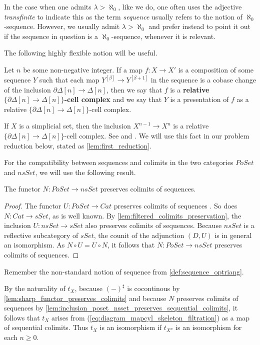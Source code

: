 In the case when one admits $\lambda >\aleph _0$, like we do, one often uses the adjective \emph{transfinite} to indicate this as the term \emph{sequence} usually refers to the notion of $\aleph _0$-sequence. However, we usually admit $\lambda >\aleph _0$ and prefer instead to point it out if the sequence in question is a $\aleph _0$-sequence, whenever it is relevant.

The following highly flexible notion \cite[Def.~10.2.1]{Hi03} will be useful.
\begin{definition}
Let $n$ be some non-negative integer. If a map $f:X\to X'$ is a composition of some sequence $Y$ such that each map $Y^{[\beta ]}\to Y^{[\beta +1]}$ in the sequence is a cobase change of the inclusion $\partial \Delta [n]\to \Delta [n]$, then we say that $f$ is a \textbf{relative $\{ \partial \Delta [n]\to \Delta [n]\}$-cell complex} and we say that $Y$ is a presentation of $f$ as a relative $\{ \partial \Delta [n]\to \Delta [n]\}$-cell complex.
\end{definition}
\noindent If $X$ is a simplicial set, then the inclusion $X^{n-1}\to X^n$ is a relative $\{ \partial \Delta [n]\to \Delta [n]\}$-cell complex. See \cite[Cor.~4.2.4~(ii)]{FP90} and \cite[Prop.~10.2.14]{Hi03}. We will use this fact in our problem reduction below, stated as \cref{lem:first_reduction}.

For the compatibility between sequences and colimits in the two categories $PoSet$ and $nsSet$, we will use the following result.
\begin{lemma}
\label{lem:inclusion_poset_nsset_preserves_sequential_colimits}
The functor $N:PoSet\to nsSet$ preserves colimits of sequences.
\end{lemma}
\begin{proof}
The functor $U:PoSet\to Cat$ preserves colimits of sequences \cite[p.~216]{Ra10}. So does $N:Cat\to sSet$, as is well known. By \cref{lem:filtered_colimits_preservation}, the inclusion $U:nsSet\to sSet$ also preserves colimits of sequences. Because $nsSet$ is a reflective subcategory of $sSet$, the counit of the adjunction $(D,U)$ is in general an isomorphism. As $N\circ U=U\circ N$, it follows that $N:PoSet\to nsSet$ preserves colimits of sequences.
\end{proof}
\noindent Remember the non-standard notion of sequence from \cref{def:sequence_optriang}.

By the naturality of $t_X$, because $(-)^\sharp$ is cocontinous by \cref{lem:sharp_functor_preserves_colimits} and because $N$ preserves colimits of sequences by \cref{lem:inclusion_poset_nsset_preserves_sequential_colimits}, it follows that $t_X$ arises from (\ref{eq:diagram_mapcyl_skeleton_filtration}) as a map of sequential colimits. Thus $t_X$ is an isomorphism if $t_{X^n}$ is an isomorphism for each $n\geq 0$.

